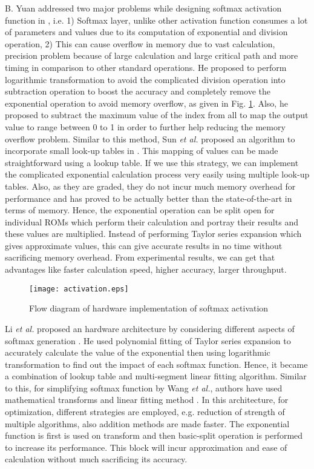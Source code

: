 \documentclass[journal]{IEEEtran}
\begin{document}
\par B. Yuan addressed two major problems while designing softmax activation function in \cite{paper14}, i.e. 1) Softmax layer, unlike other activation function consumes a lot of parameters and values due to its computation of exponential and division operation, 2) This can cause overflow in memory due to vast calculation, precision problem because of large calculation and large critical path and more timing in comparison to other standard operations. He proposed to perform logarithmic transformation to avoid the complicated division operation into subtraction operation to boost the accuracy and completely remove the exponential operation to avoid memory overflow, as given in Fig. \ref{fig:softmax}. Also, he proposed to subtract the maximum value of the index from all to map the output value to range between 0 to 1 in order to further help reducing the memory overflow problem. Similar to this method, Sun \textit{et al.} proposed an algorithm to incorporate small look-up tables in \cite{paper15}. This mapping of values can be made straightforward using a lookup table. If we use this strategy, we can implement the complicated exponential calculation process very easily using multiple look-up tables. Also, as they are graded, they do not incur much memory overhead for performance and has proved to be actually better than the state-of-the-art in terms of memory. Hence, the exponential operation can be split open for individual ROMs which perform their calculation and portray their results and these values are multiplied. Instead of performing Taylor series expansion which gives approximate values, this can give accurate results in no time without sacrificing memory overhead. From experimental results, we can get that advantages like faster calculation speed, higher accuracy, larger throughput.

\begin{figure}[b]
    \centering
    \texttt{[image: activation.eps]}
    \caption{Flow diagram of hardware implementation of softmax activation \cite{paper14}}
    \label{fig:softmax}
\end{figure}

\par Li \textit{et al.} proposed an hardware architecture by considering different aspects of softmax generation \cite{paper16}. He used polynomial fitting of Taylor series expansion to accurately calculate the value of the exponential then using logarithmic transformation to find out the impact of each softmax function. Hence, it became a combination of lookup table and multi-segment linear fitting algorithm. Similar to this, for simplifying softmax function by Wang \textit{et al.}, authors have used mathematical transforms and linear fitting method \cite{paper17}. In this architecture, for optimization, different strategies are employed, e.g. reduction of strength of multiple algorithms, also addition methods are made faster. The exponential function is first is used on transform and then basic-split operation is performed to increase its performance. This block will incur approximation and ease of calculation without much sacrificing its accuracy.
\end{document}
